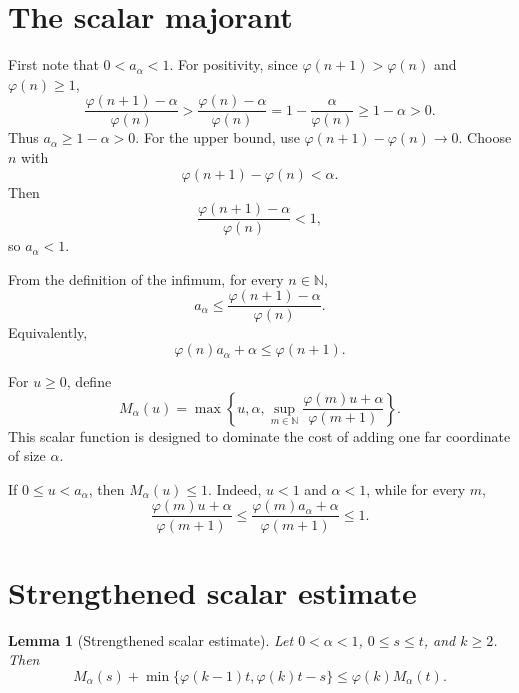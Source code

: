\documentclass[11pt]{article}
\newcommand{\ph}{\varphi}
\newcommand{\N}{\mathbb N}
\newtheorem*{lemma*}{Lemma}
\begin{document}
\section{The scalar majorant}

First note that \(0<a_\alpha<1\).  For positivity, since
\(\ph(n+1)>\ph(n)\) and \(\ph(n)\ge 1\),
\[
 \frac{\ph(n+1)-\alpha}{\ph(n)}
 >
 \frac{\ph(n)-\alpha}{\ph(n)}
 =
 1-\frac{\alpha}{\ph(n)}
 \ge
 1-\alpha>0.
\]
Thus \(a_\alpha\ge 1-\alpha>0\).  For the upper bound, use
\(\ph(n+1)-\ph(n)\to 0\).  Choose \(n\) with
\[
 \ph(n+1)-\ph(n)<\alpha.
\]
Then
\[
 \frac{\ph(n+1)-\alpha}{\ph(n)}<1,
\]
so \(a_\alpha<1\).

From the definition of the infimum, for every \(n\in\N\),
\[
 a_\alpha
 \le
 \frac{\ph(n+1)-\alpha}{\ph(n)}.
\]
Equivalently,
\[
 \ph(n)a_\alpha+\alpha\le \ph(n+1).
\]

For \(u\ge 0\), define
\[
 M_\alpha(u)
 =
 \max\left\{
 u,\alpha,
 \sup_{m\in\N}
 \frac{\ph(m)u+\alpha}{\ph(m+1)}
 \right\}.
\]
This scalar function is designed to dominate the cost of adding one far
coordinate of size \(\alpha\).

If \(0\le u<a_\alpha\), then \(M_\alpha(u)\le 1\).  Indeed, \(u<1\) and
\(\alpha<1\), while for every \(m\),
\[
 \frac{\ph(m)u+\alpha}{\ph(m+1)}
 \le
 \frac{\ph(m)a_\alpha+\alpha}{\ph(m+1)}
 \le
 1.
\]

\section{Strengthened scalar estimate}

\begin{lemma*}[Strengthened scalar estimate]
Let \(0<\alpha<1\), \(0\le s\le t\), and \(k\ge 2\). Then
\[
 M_\alpha(s)
 +
 \min\{\ph(k-1)t,\ph(k)t-s\}
 \le
 \ph(k)M_\alpha(t).
\]
\end{lemma*}
\end{document}
